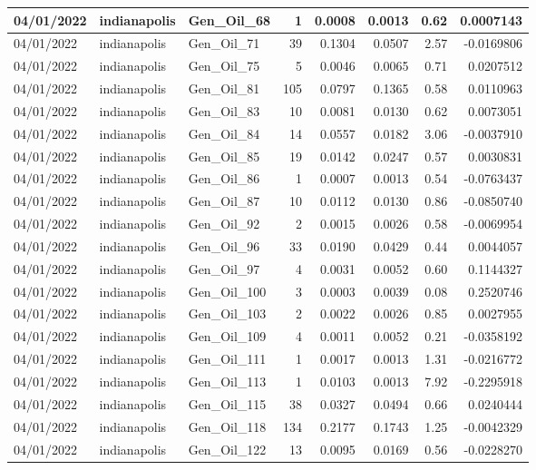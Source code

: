 \documentclass[
  letterpaper,
  DIV=11,
  numbers=noendperiod]{scrartcl}
\begin{document}
\begin{tabular}{l|l|l|r|r|r|r|r}
\hline
04/01/2022 & indianapolis & Gen\_Oil\_68 & 1 & 0.0008 & 0.0013 & 0.62 & 0.0007143\\
\hline
04/01/2022 & indianapolis & Gen\_Oil\_71 & 39 & 0.1304 & 0.0507 & 2.57 & -0.0169806\\
\hline
04/01/2022 & indianapolis & Gen\_Oil\_75 & 5 & 0.0046 & 0.0065 & 0.71 & 0.0207512\\
\hline
04/01/2022 & indianapolis & Gen\_Oil\_81 & 105 & 0.0797 & 0.1365 & 0.58 & 0.0110963\\
\hline
04/01/2022 & indianapolis & Gen\_Oil\_83 & 10 & 0.0081 & 0.0130 & 0.62 & 0.0073051\\
\hline
04/01/2022 & indianapolis & Gen\_Oil\_84 & 14 & 0.0557 & 0.0182 & 3.06 & -0.0037910\\
\hline
04/01/2022 & indianapolis & Gen\_Oil\_85 & 19 & 0.0142 & 0.0247 & 0.57 & 0.0030831\\
\hline
04/01/2022 & indianapolis & Gen\_Oil\_86 & 1 & 0.0007 & 0.0013 & 0.54 & -0.0763437\\
\hline
04/01/2022 & indianapolis & Gen\_Oil\_87 & 10 & 0.0112 & 0.0130 & 0.86 & -0.0850740\\
\hline
04/01/2022 & indianapolis & Gen\_Oil\_92 & 2 & 0.0015 & 0.0026 & 0.58 & -0.0069954\\
\hline
04/01/2022 & indianapolis & Gen\_Oil\_96 & 33 & 0.0190 & 0.0429 & 0.44 & 0.0044057\\
\hline
04/01/2022 & indianapolis & Gen\_Oil\_97 & 4 & 0.0031 & 0.0052 & 0.60 & 0.1144327\\
\hline
04/01/2022 & indianapolis & Gen\_Oil\_100 & 3 & 0.0003 & 0.0039 & 0.08 & 0.2520746\\
\hline
04/01/2022 & indianapolis & Gen\_Oil\_103 & 2 & 0.0022 & 0.0026 & 0.85 & 0.0027955\\
\hline
04/01/2022 & indianapolis & Gen\_Oil\_109 & 4 & 0.0011 & 0.0052 & 0.21 & -0.0358192\\
\hline
04/01/2022 & indianapolis & Gen\_Oil\_111 & 1 & 0.0017 & 0.0013 & 1.31 & -0.0216772\\
\hline
04/01/2022 & indianapolis & Gen\_Oil\_113 & 1 & 0.0103 & 0.0013 & 7.92 & -0.2295918\\
\hline
04/01/2022 & indianapolis & Gen\_Oil\_115 & 38 & 0.0327 & 0.0494 & 0.66 & 0.0240444\\
\hline
04/01/2022 & indianapolis & Gen\_Oil\_118 & 134 & 0.2177 & 0.1743 & 1.25 & -0.0042329\\
\hline
04/01/2022 & indianapolis & Gen\_Oil\_122 & 13 & 0.0095 & 0.0169 & 0.56 & -0.0228270\\

\end{tabular}
\end{document}
